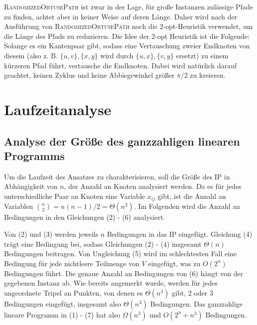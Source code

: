 \documentclass[a4paper, 10pt, ngerman]{article}
\begin{document}
\textsc{RandomizedObtusePath} ist zwar in der Lage, für große Instanzen zulässige Pfade zu finden, achtet aber in keiner Weise auf deren Länge. Daher wird nach der Ausführung von \textsc{RandomizedObtusePath} noch die 2-opt-Heuristik verwendet, um die Länge des Pfads zu reduzieren. Die Idee der 2-opt Heuristik ist die Folgende: Solange es ein Kantenpaar gibt, sodass eine Vertauschung zweier Endknoten von diesem (also z. B. $\{u, v\}, \{x, y\}$ wird durch $\{u, x\}, \{v, y\}$ ersetzt) zu einem kürzeren Pfad führt, vertausche die Endknoten. Dabei wird natürlich darauf geachtet, keinen Zyklus und keine Abbiegewinkel größer $\pi / 2$ zu kreieren.

\section{Laufzeitanalyse}

\subsection{Analyse der Größe des ganzzahligen linearen Programms}

Um die Laufzeit des Ansatzes zu charakterisieren, soll die Größe des IP in Abhängigkeit von $n$, der Anzahl an Knoten analysiert werden. Da es für jedes unterschiedliche Paar an Knoten eine Variable $x_{ij}$ gibt, ist die Anzahl an Variablen $\binom n 2 = n(n - 1) / 2 = \Theta(n^2)$. Im Folgenden wird die Anzahl an Bedingungen in den Gleichungen (2) - (6) analysiert.

Von (2) und (3) werden jeweils $n$ Bedingungen in das IP eingefügt. Gleichung (4) trägt eine Bedingung bei, sodass Gleichungen (2) - (4) insgesamt $\Theta(n)$ Bedingungen beitragen. Von Ungleichung (5) wird im schlechtesten Fall eine Bedingung für jede nichtleere Teilmenge von $V$ eingefügt, was zu $O(2^n)$ Bedingungen führt. Die genaue Anzahl an Bedingungen von (6) hängt von der gegebenen Instanz ab. Wie bereits angemerkt wurde, werden für jedes ungeordnete Tripel an Punkten, von denen es $\Theta(n^3)$ gibt, 2 oder 3 Bedingungen eingefügt, insgesamt also $\Theta(n^3)$ Bedingungen. Das ganzzahlige lineare Programm in (1) - (7) hat also $\Omega(n^3)$ und $O(2^n + n^3)$ Bedingungen.
\end{document}
